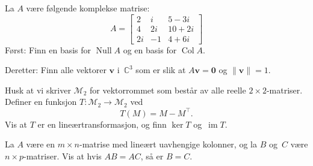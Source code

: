 \documentclass[titlepage,a4paper,12pt,norsk]{IMFeksamen}
\newcommand{\C}{\mathbb{C}}
\newcommand{\M}{\mathcal{M}} %
\DeclareMathOperator{\Null}{Null}
\DeclareMathOperator{\Col}{Col}
\DeclareMathOperator{\im}{im}
\newcommand{\tr}{^\top}
\newcommand{\V}[1]{\mathbf{#1}}
\newcommand{\vvv}[3]{\begin{bmatrix} #1 \\ #2 \\ #3 \end{bmatrix}}
\renewcommand{\v}{\V{v}}
\newcommand{\0}{\V{0}}
\begin{document}
\begin{oppgave}
La $A$ være følgende komplekse matrise:
\[
A =
\begin{bmatrix}
2  &  i &  5 - 3i \\
4  & 2i & 10 + 2i \\
2i & -1 &  4 + 6i
\end{bmatrix}
\]
Først: Finn en basis for $\Null A$ og en basis for $\Col A$.

Deretter: Finn alle vektorer $\v$ i~$\C^3$ som er slik at
$A\v = \0$
og
$\| \v \| = 1$.
\end{oppgave}


\begin{oppgave}
Husk at vi skriver $\M_2$ for vektorrommet som består av alle reelle
$2 \times 2$-matriser.
Definer en funksjon $T \colon \M_2 \to \M_2$ ved
\[
T(M) = M - M\tr.
\]
Vis at $T$ er en lineærtransformasjon, og finn $\ker T$ og~$\im T$.
\end{oppgave}


\begin{oppgave}
La $A$ være en $m \times n$-matrise med lineært uavhengige kolonner,
og la $B$ og~$C$ være $n \times p$-matriser.
Vis at hvis $AB = AC$, så er $B = C$.
\end{oppgave}
\end{document}
